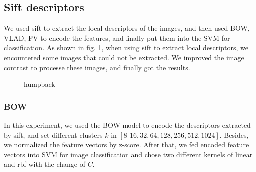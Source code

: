 \documentclass[conference]{IEEEtran}
\begin{document}
\subsection{Sift descriptors}
We used sift to extract the local descriptors of the images, and then used BOW, VLAD, FV to encode the features, and finally put them into the SVM for classification. As shown in fig. \ref{Fig1}, when using sift to extract local descriptors, we encountered some images that could not be extracted. We improved the image contrast to processe these images, and finally got the results.
\begin{center}
	\begin{figure}
		\centering
		\quad
		\quad
		\caption{humpback}
		\label{Fig1}
	\end{figure}
\end{center}
\subsubsection{BOW}
\label{sec:z-score}
In this experiment, we used the BOW model to encode the descriptors extracted by sift, and set different clusters $k$ in $[8,16,32,64,128,256,512,1024]$. Besides, we normalized the feature vectors by z-score. After that, we fed encoded feature vectors into SVM for image classification and chose two different kernels of linear and rbf with the change of $C$.
\end{document}

